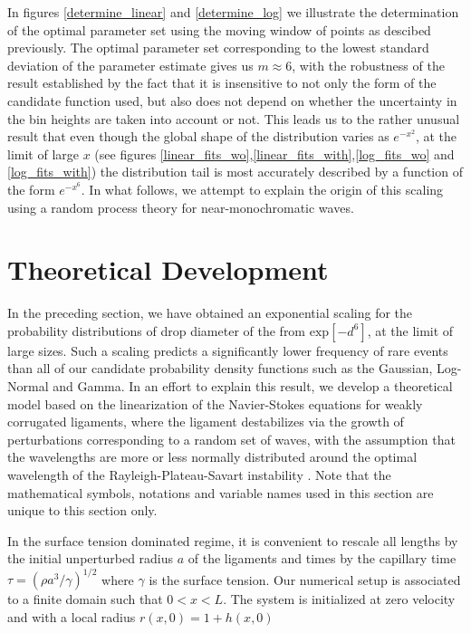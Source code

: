 In figures \ref{determine_linear} and \ref{determine_log} we illustrate the determination
of the optimal parameter set using the moving window of points as descibed previously.
The optimal parameter set corresponding to the lowest standard deviation of the parameter estimate
gives us $m \approx 6$, with the robustness of the result established by the fact that 
it is insensitive to not only the form of the candidate function used, but also does not depend 
on whether the uncertainty in the bin heights are taken into account or not.
This leads us to the rather unusual result that even though the global shape of 
the distribution varies as $e^{-x^2}$, at the limit of large $x$ 
(see figures \ref{linear_fits_wo},\ref{linear_fits_with},\ref{log_fits_wo} and \ref{log_fits_with})
the distribution tail is most accurately described by a function of the form $e^{-x^6}$.
In what follows, we attempt to explain the origin of this scaling
using a random process theory for near-monochromatic waves. 

\section{Theoretical Development}

\newcommand\be{\begin{equation}}
\newcommand\nd{\end{equation}}
\newcommand\ii{{\textrm{i}}}

In the preceding section, we have obtained an exponential scaling for the probability distributions
of drop diameter of the from $\textrm{exp}[-d^6]$, at the limit of large sizes. 
Such a scaling predicts a significantly lower frequency of rare events than all of our candidate 
probability density functions such as the Gaussian, Log-Normal and Gamma. 
In an effort to explain this result, we develop a theoretical model based on the 
linearization of the Navier-Stokes equations for weakly corrugated ligaments, where the ligament destabilizes 
via the growth of perturbations corresponding to a random set of waves, with the assumption
that the wavelengths are more or less normally distributed around the optimal wavelength 
of the Rayleigh-Plateau-Savart instability \cite{rayleigh1879a,plateau1849}.  Note that the mathematical symbols, notations and variable names used in this section are unique to this section only.

In the surface tension dominated regime, it is convenient to rescale all lengths by the
initial unperturbed radius $a$ of the ligaments and times by the capillary time
$\tau = (\rho a^3/\gamma)^{1/2}$ where $\gamma$ is the surface tension.
Our numerical setup is associated to a finite domain such that $0 < x < L$. 
The system is initialized at zero velocity and with a local radius $r(x,0) = 1 + h(x,0)$

